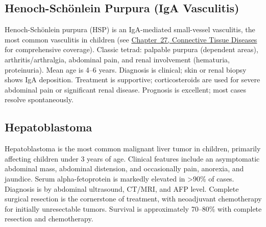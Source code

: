 \subsection{Henoch-Sch\"onlein Purpura (IgA Vasculitis)}
\label{sec:Henoch-Schonlein Purpura}
Henoch-Sch\"onlein purpura (HSP) is an IgA-mediated small-vessel vasculitis, the most common vasculitis in children (see \hyperref[ch:connective_tissue]{Chapter~27, Connective Tissue Diseases} for comprehensive coverage). Classic tetrad: palpable purpura (dependent areas), arthritis/arthralgia, abdominal pain, and renal involvement (hematuria, proteinuria). Mean age is 4--6 years. Diagnosis is clinical; skin or renal biopsy shows IgA deposition. Treatment is supportive; corticosteroids are used for severe abdominal pain or significant renal disease. Prognosis is excellent; most cases resolve spontaneously.

\subsection{Hepatoblastoma}
\label{sec:Hepatoblastoma}
Hepatoblastoma is the most common malignant liver tumor in children, primarily affecting children under 3 years of age. Clinical features include an asymptomatic abdominal mass, abdominal distension, and occasionally pain, anorexia, and jaundice. Serum alpha-fetoprotein is markedly elevated in >90\% of cases. Diagnosis is by abdominal ultrasound, CT/MRI, and AFP level. Complete surgical resection is the cornerstone of treatment, with neoadjuvant chemotherapy for initially unresectable tumors. Survival is approximately 70--80\% with complete resection and chemotherapy.

